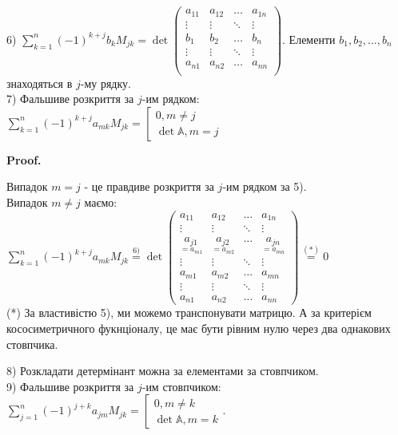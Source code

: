 \documentclass[a4paper, 10pt]{article}
\makeatletter
\theoremstyle{theoremdd}
\renewenvironment{proof}[1][Proof.\\]{\par
\pushQED{\hfill \qed}%
\normalfont \topsep6\p@\@plus6\p@\relax
\trivlist
\item\relax
{\bfseries
#1\@addpunct{.}}\hspace\labelsep\ignorespaces
}{%
\popQED\endtrivlist\@endpefalse
}
\makeatother
\begin{document}
6) $\displaystyle\sum_{k=1}^n (-1)^{k+j} b_k M_{jk} = \det \begin{pmatrix}
a_{11} & a_{12} & \dots & a_{1n} \\
\vdots & \vdots & \ddots & \vdots \\
b_1 & b_2 & \dots & b_n \\
\vdots & \vdots & \ddots & \vdots \\
a_{n1} & a_{n2} & \dots & a_{nn} \\
\end{pmatrix}$. Елементи $b_1,b_2,\dots,b_n$ знаходяться в $j$-му рядку.
\bigskip \\
7) \textquotedbl Фальшиве\textquotedbl{} розкриття за $j$-им рядком: $\displaystyle \sum_{k=1}^n (-1)^{k+j} a_{mk}M_{jk} = \left[\begin{gathered} 0, m \neq j \\ \det \mathbb{A}, m = j \end{gathered} \right.$

\begin{proof}
Випадок $m = j$ - це \textquotedbl правдиве\textquotedbl{} розкриття за $j$-им рядком за 5).\\
Випадок $m \neq j$ маємо:\\
$\displaystyle \sum_{k=1}^n (-1)^{k+j} a_{mk} M_{jk} \overset{\textrm{6)}}{=} \det \begin{pmatrix}
a_{11} & a_{12} & \dots & a_{1n} \\
\vdots & \vdots & \ddots & \vdots \\
\underset{=a_{m1}}{a_{j1}} & \underset{=a_{m2}}{a_{j2}} & \dots & \underset{=a_{mn}}{a_{jn}} \\
\vdots & \vdots & \ddots & \vdots \\
a_{m1} & a_{m2} & \dots & a_{mn} \\
\vdots & \vdots & \ddots & \vdots \\
a_{n1} & a_{n2} & \dots & a_{nn}
\end{pmatrix} \overset{(*)}{=} 0$\\
(*) За властивістю 5), ми можемо транспонувати матрицю. А за критерієм кососиметричного фукнціоналу, це має бути рівним нулю через два однакових стовпчика.
\end{proof}

8) Розкладати детермінант можна за елементами за стовпчиком.\\
9) \textquotedbl Фальшиве\textquotedbl{} розкриття за $j$-им стовпчиком: $\displaystyle \sum_{j=1}^n (-1)^{j+k} a_{jm}M_{jk} = \left[\begin{gathered} 0, m \neq k \\ \det \mathbb{A}, m = k \end{gathered} \right.$.
\end{document}
